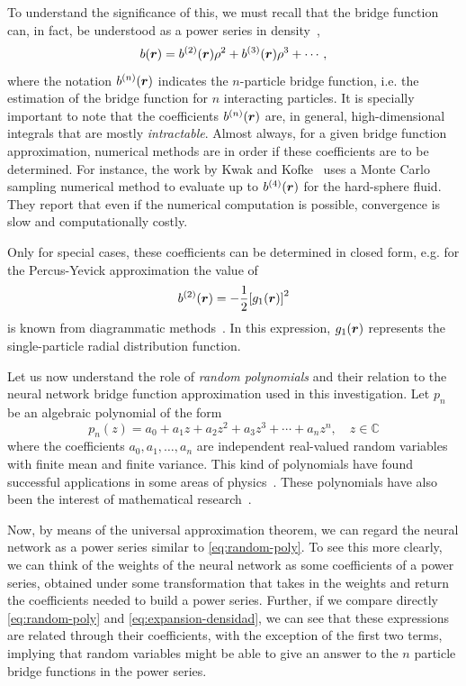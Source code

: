 To understand the significance of this, we must recall that the bridge function can, in 
fact, be understood as a
power series in density~\cite{hansenTheorySimpleLiquids2013},
\begin{equation}
    b(\bm{r}) = b^{(2)}(\bm{r}) \rho^2 + b^{(3)}(\bm{r}) \rho^3 + \cdots ,
    \label{eq:expansion-densidad}
\end{equation}
where the notation $b^{(n)}(\bm{r})$ indicates the $n$-particle bridge function, i.e. the
estimation of the bridge function for $n$ interacting particles. It is specially
important to note that the coefficients $b^{(n)}(\bm{r})$ are, in general, high-dimensional
integrals that are mostly \emph{intractable}. Almost always, for a given bridge function
approximation, numerical methods are in order if these coefficients are to be determined.
For instance, the work by Kwak and Kofke~\cite{kwakEvaluationBridgefunctionDiagrams2005}
uses a Monte Carlo sampling numerical method to evaluate up to $b^{(4)}(\bm{r})$ 
for the hard-sphere fluid. They report that even if the numerical computation is
possible, convergence is slow and computationally costly.

Only for special cases, these coefficients can be determined in closed form, e.g.
for the Percus-Yevick approximation the value of
\[
b^{(2)}(\bm{r}) = -\frac{1}{2}{\left[ g_{1}(\bm{r}) \right]}^2
\]
is known from diagrammatic methods~\cite{hansenTheorySimpleLiquids2013}. In this
expression, $g_{1}(\bm{r})$ represents the single-particle radial distribution function.

Let us now understand the role of \emph{random polynomials} and their relation to the neural
network bridge function approximation used in this investigation.
Let $p_n$ be an algebraic polynomial of the form
\begin{equation}
    p_n(z) = a_0 + a_1 z + a_2 z^2 + a_3 z^3 + \cdots + a_n z^n, \quad
    z \in \mathbb{C}
    \label{eq:random-poly}
\end{equation}
where the coefficients $a_0, a_1, \dots , a_n$ are independent real-valued random variables
with finite mean and finite variance. This kind of polynomials have found successful
applications in some areas of physics~\cite{houghZerosGaussianAnalytic2009}.
These polynomials have also been the interest of mathematical research~\cite{edelmanHowManyZeros1995}.

Now, by means of the universal approximation theorem, we can regard the neural network
as a power series similar to \autoref{eq:random-poly}. To see this more clearly, we
can think of the weights of the neural network as some coefficients of a power series,
obtained under some transformation that takes in the weights and return the coefficients
needed to build a power series.
Further, if we compare directly \autoref{eq:random-poly}
and \autoref{eq:expansion-densidad}, we can see that these expressions
are related through their coefficients, with the exception of the first two terms, implying 
that random variables might be able to give an answer to the $n$ particle bridge functions 
in the power series.

